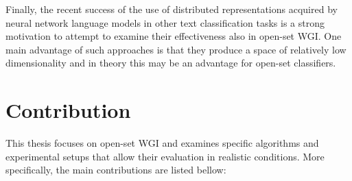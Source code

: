 Finally, the recent success of the use of distributed representations acquired by neural network language models in other text classification tasks is a strong motivation to attempt to examine their effectiveness also in open-set WGI. One main advantage of such approaches is that they produce a space of relatively low dimensionality and in theory this may be an advantage for open-set classifiers.

\section{Contribution} \label{chap:introduction:sec:contribution}

This thesis focuses on open-set WGI and examines specific algorithms and experimental setups that allow their evaluation in realistic conditions. More specifically, the main contributions are listed bellow:

